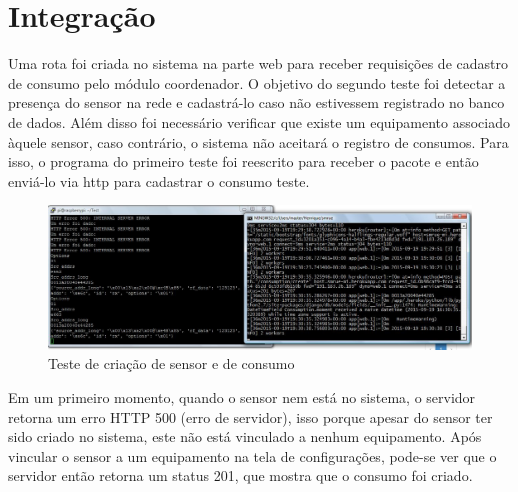 \section{Integração}
Uma rota foi criada no sistema na parte web para receber requisições de cadastro de consumo pelo módulo coordenador. O objetivo do segundo teste foi detectar a presença do sensor na rede e cadastrá-lo caso não estivessem registrado no banco de dados. Além disso foi necessário verificar que existe um equipamento associado àquele sensor, caso contrário, o sistema não aceitará o registro de consumos.
Para isso, o programa do primeiro teste foi reescrito para receber o pacote e então enviá-lo via http para cadastrar o consumo teste.

\begin{figure}[H]
\centering
\includegraphics[width=1\textwidth]{figuras/sensor_creation.jpg}
\caption{\label{fig:sensor_creation} Teste de criação de sensor e de consumo }
\end{figure}

Em um primeiro momento, quando o sensor nem está no sistema,  o servidor retorna um erro HTTP 500 (erro de servidor), isso porque apesar do sensor ter sido criado no sistema, este não está vinculado a nenhum equipamento. Após vincular o sensor a um equipamento na tela de configurações, pode-se ver que o servidor então retorna um status 201, que mostra que o consumo foi criado.


